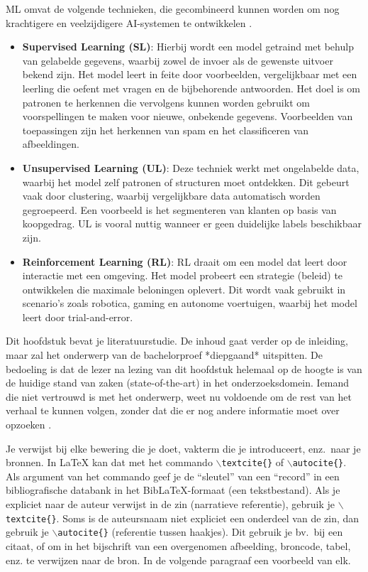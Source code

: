 ML omvat de volgende technieken, die gecombineerd kunnen worden om nog krachtigere en veelzijdigere AI-systemen te ontwikkelen \autocite{Kouassi2023}. 

\begin{itemize}
  \item \textbf{Supervised Learning (SL)}: Hierbij wordt een model getraind met behulp van gelabelde gegevens, waarbij zowel de invoer als de gewenste uitvoer bekend zijn. Het model leert in feite door voorbeelden, vergelijkbaar met een leerling die oefent met vragen en de bijbehorende antwoorden. Het doel is om patronen te herkennen die vervolgens kunnen worden gebruikt om voorspellingen te maken voor nieuwe, onbekende gegevens. Voorbeelden van toepassingen zijn het herkennen van spam en het classificeren van afbeeldingen.
  \item \textbf{Unsupervised Learning (UL)}: Deze techniek werkt met ongelabelde data, waarbij het model zelf patronen of structuren moet ontdekken. Dit gebeurt vaak door clustering, waarbij vergelijkbare data automatisch worden gegroepeerd. Een voorbeeld is het segmenteren van klanten op basis van koopgedrag. UL is vooral nuttig wanneer er geen duidelijke labels beschikbaar zijn. 
  \item \textbf{Reinforcement Learning (RL)}: RL draait om een model dat leert door interactie met een omgeving. Het model probeert een strategie (beleid) te ontwikkelen die maximale beloningen oplevert. Dit wordt vaak gebruikt in scenario's zoals robotica, gaming en autonome voertuigen, waarbij het model leert door trial-and-error. 
\end{itemize}

Dit hoofdstuk bevat je literatuurstudie. De inhoud gaat verder op de inleiding, maar zal het onderwerp van de bachelorproef *diepgaand* uitspitten. De bedoeling is dat de lezer na lezing van dit hoofdstuk helemaal op de hoogte is van de huidige stand van zaken (state-of-the-art) in het onderzoeksdomein. Iemand die niet vertrouwd is met het onderwerp, weet nu voldoende om de rest van het verhaal te kunnen volgen, zonder dat die er nog andere informatie moet over opzoeken \autocite{Pollefliet2011}.

Je verwijst bij elke bewering die je doet, vakterm die je introduceert, enz.\ naar je bronnen. In \LaTeX{} kan dat met het commando \texttt{$\backslash${textcite\{\}}} of \texttt{$\backslash${autocite\{\}}}. Als argument van het commando geef je de ``sleutel'' van een ``record'' in een bibliografische databank in het Bib\LaTeX{}-formaat (een tekstbestand). Als je expliciet naar de auteur verwijst in de zin (narratieve referentie), gebruik je \texttt{$\backslash${}textcite\{\}}. Soms is de auteursnaam niet expliciet een onderdeel van de zin, dan gebruik je \texttt{$\backslash${}autocite\{\}} (referentie tussen haakjes). Dit gebruik je bv.~bij een citaat, of om in het bijschrift van een overgenomen afbeelding, broncode, tabel, enz. te verwijzen naar de bron. In de volgende paragraaf een voorbeeld van elk.

